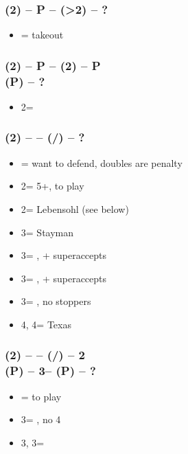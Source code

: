 \documentclass[12pt, a4paper]{article}
\begin{document}
\subsubsection*{(2\diams) -- P -- (>2\spades) -- ?}
\begin{itemize}
    \item \dbl = takeout \imp
\end{itemize}

\subsubsection*{(2\diams) -- P -- (2\hearts) -- P \\
                (P) -- ?}        
\begin{itemize}
    \item 2\nt = \minor
\end{itemize}

\subsubsection*{(2\diams) -- \dbl -- (\rdbl/\pass) -- ?}        
\begin{itemize}
    \item \pass = want to defend, doubles are penalty
    \item 2\major = 5+\major, to play
    \item 2\nt = Lebensohl (see below)
    \item 3\clubs = Stayman \vimp
    \item 3\diams = \trsf{\hearts}, \gf + superaccepts
    \item 3\hearts = \trsf{\spades}, \gf + superaccepts
    \item 3\spades = \trsf{\nt}, no \major stoppers
    \item 4\diams, 4\hearts = Texas
\end{itemize}

\subsubsection*{(2\diams) -- \dbl -- (\rdbl/\pass) -- 2\nt \\
                (P) -- 3\clubs -- (P) -- ?}        
\begin{itemize}
    \item \pass = to play
    \item 3\diams = \gf, no 4\major \vimp
    \item 3\hearts, 3\spades = \inv
\end{itemize}
\end{document}
